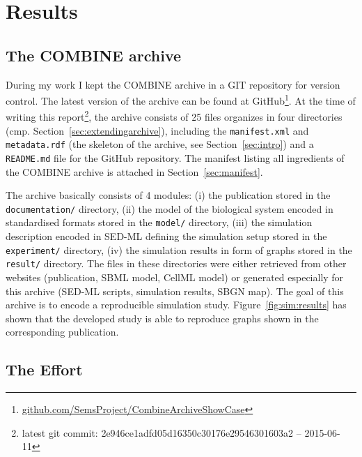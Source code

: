 
\section{Results}

\subsection{The COMBINE archive}
During my work I kept the COMBINE archive in a GIT repository for version control.
The latest version of the archive can be found at GitHub\footnote{\href{https://github.com/SemsProject/CombineArchiveShowCase}{github.com/SemsProject/CombineArchiveShowCase}}.
At the time of writing this report\footnote{latest git commit: 2e946ce1adfd05d16350c30176e29546301603a2 -- 2015-06-11}, the archive consists of 25 files organizes in four directories (cmp. Section~\ref{sec:extendingarchive}), including the \texttt{manifest.xml} and \texttt{metadata.rdf} (the skeleton of the archive, see Section~\ref{sec:intro}) and a \texttt{README.md} file for the GitHub repository.
The manifest listing all ingredients of the COMBINE archive is attached in Section~\ref{sec:manifest}.

The archive basically consists of 4 modules: (i) the publication stored in the \texttt{documentation/} directory, (ii) the model of the biological system encoded in standardised formats stored in the \texttt{model/} directory, (iii) the simulation description encoded in SED-ML defining the simulation setup stored in the \texttt{experiment/} directory, (iv) the simulation results in form of graphs stored in the \texttt{result/} directory.
The files in these directories were either retrieved from other websites (publication, SBML model, CellML model) or generated especially for this archive (SED-ML scripts, simulation results, SBGN map).
The goal of this archive is to encode a reproducible simulation study.
Figure~\ref{fig:sim:results} has shown that the developed study is able to reproduce graphs shown in the corresponding publication.



\subsection{The Effort}




